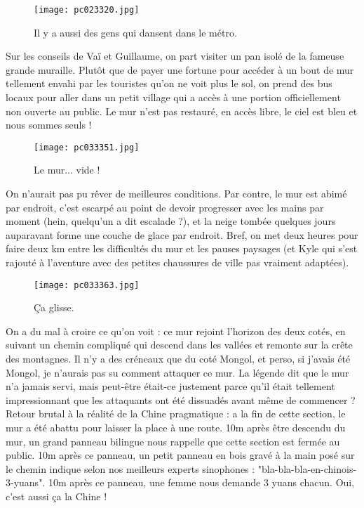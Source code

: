 \documentclass{book}
\begin{document}
\begin{figure}[h]
\centering
\texttt{[image: pc023320.jpg]}
\caption*{ Il y a aussi des gens qui dansent dans le métro.}
\end{figure}

Sur les conseils de Vaï et Guillaume, on part visiter un pan isolé de la fameuse grande muraille. Plutôt que de payer une fortune pour accéder à un bout de mur tellement envahi par les touristes qu'on ne voit plus le sol, on prend des bus locaux pour aller dans un petit village qui a accès à une portion officiellement non ouverte au public. Le mur n'est pas restauré, en accès libre, le ciel est bleu et nous sommes seuls !


\begin{figure}[h]
\centering
\texttt{[image: pc033351.jpg]}
\caption*{ Le mur... vide !}
\end{figure}

On n'aurait pas pu rêver de meilleures conditions. Par contre, le mur est abimé par endroit, c'est escarpé au point de devoir progresser avec les mains par moment (hein, quelqu'un a dit escalade ?), et la neige tombée quelques jours auparavant forme une couche de glace par endroit. Bref, on met deux heures pour faire deux km entre les difficultés du mur et les pauses paysages (et Kyle qui s'est rajouté à l'aventure avec des petites chaussures de ville pas vraiment adaptées).


\begin{figure}[h]
\centering
\texttt{[image: pc033363.jpg]}
\caption*{ Ça glisse.}
\end{figure}

On a du mal à croire ce qu'on voit : ce mur rejoint l'horizon des deux cotés, en suivant un chemin compliqué qui descend dans les vallées et remonte sur la crête des montagnes. Il n'y a des créneaux que du coté Mongol, et perso, si j'avais été Mongol, je n'aurais pas su comment attaquer ce mur. La légende dit que le mur n'a jamais servi, mais peut-être était-ce justement parce qu'il était tellement impressionnant que les attaquants ont été dissuadés avant même de commencer ? Retour brutal à la réalité de la Chine pragmatique : a la fin de cette section, le mur a été abattu pour laisser la place à une route. 10m après être descendu du mur, un grand panneau bilingue nous rappelle que cette section est fermée au public. 10m après ce panneau, un petit panneau en bois gravé à la main posé sur le chemin indique selon nos meilleurs experts sinophones : "bla-bla-bla-en-chinois-3-yuans". 10m après ce panneau, une femme nous demande 3 yuans chacun. Oui, c'est aussi ça la Chine !
\end{document}
